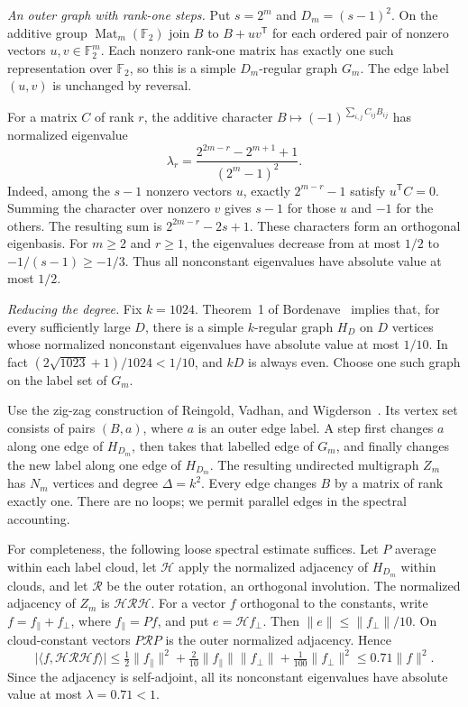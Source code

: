 \begin{informalproof}
\emph{An outer graph with rank-one steps.}
Put $s=2^m$ and $D_m=(s-1)^2$.  On the additive group
$\operatorname{Mat}_m(\mathbb F_2)$ join $B$ to $B+uv^{\mathsf T}$
for each ordered pair of nonzero vectors $u,v\in\mathbb F_2^m$.
Each nonzero rank-one matrix has exactly one such representation over
$\mathbb F_2$, so this is a simple $D_m$-regular graph $G_m$.
The edge label $(u,v)$ is unchanged by reversal.

For a matrix $C$ of rank $r$, the additive character
$B\mapsto(-1)^{\sum_{i,j}C_{ij}B_{ij}}$ has normalized eigenvalue
\begin{equation}
 \lambda_r=
 \frac{2^{2m-r}-2^{m+1}+1}{(2^m-1)^2}.
 \label{eq:mc-outer-spectrum}
\end{equation}
Indeed, among the $s-1$ nonzero vectors $u$, exactly $2^{m-r}-1$
satisfy $u^{\mathsf T}C=0$.  Summing the character over nonzero $v$
gives $s-1$ for those $u$ and $-1$ for the others.  The resulting sum
is $2^{2m-r}-2s+1$.  These characters form an orthogonal eigenbasis.
For $m\ge2$ and $r\ge1$, the eigenvalues decrease from at most $1/2$
to $-1/(s-1)\ge-1/3$.  Thus all nonconstant eigenvalues have absolute
value at most $1/2$.

\emph{Reducing the degree.}
Fix $k=1024$.  Theorem~1 of Bordenave~\cite{Bordenave} implies that,
for every sufficiently large $D$, there is a simple $k$-regular graph
$H_D$ on $D$ vertices whose normalized nonconstant eigenvalues have
absolute value at most $1/10$.  In fact
$(2\sqrt{1023}+1)/1024<1/10$, and $kD$ is always even.
Choose one such graph on the label set of $G_m$.

Use the zig-zag construction of Reingold, Vadhan, and
Wigderson~\cite[Section~3]{RVW}.  Its vertex set consists of pairs $(B,a)$,
where $a$ is an outer edge label.  A step first changes $a$ along one
edge of $H_{D_m}$, then takes that labelled edge of $G_m$, and finally
changes the new label along one edge of $H_{D_m}$.
The resulting undirected multigraph $Z_m$ has $N_m$ vertices and degree
$\Delta=k^2$.  Every edge changes $B$ by a matrix of rank exactly one.
There are no loops; we permit parallel edges in the spectral accounting.

For completeness, the following loose spectral estimate suffices.
Let $P$ average within each label cloud, let $\mathcal H$ apply the
normalized adjacency of $H_{D_m}$ within clouds, and let $\mathcal R$
be the outer rotation, an orthogonal involution.
The normalized adjacency of $Z_m$ is
$\mathcal H\mathcal R\mathcal H$.
For a vector $f$ orthogonal to the constants, write
$f=f_\parallel+f_\perp$, where $f_\parallel=Pf$, and put
$e=\mathcal Hf_\perp$.  Then $\|e\|\le\|f_\perp\|/10$.
On cloud-constant vectors $P\mathcal RP$ is the outer normalized
adjacency.  Hence
\[
 \bigl|\langle f,\mathcal H\mathcal R\mathcal Hf\rangle\bigr|
 \le\tfrac12\|f_\parallel\|^2
      +\tfrac2{10}\|f_\parallel\|\|f_\perp\|
      +\tfrac1{100}\|f_\perp\|^2
 \le0.71\|f\|^2.
\]
Since the adjacency is self-adjoint, all its nonconstant eigenvalues
have absolute value at most $\lambda=0.71<1$.


\end{informalproof}
